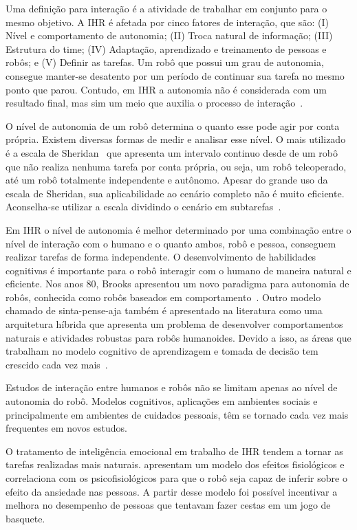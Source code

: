 Uma definição para interação é a atividade de trabalhar em conjunto para o mesmo objetivo. A IHR é afetada por cinco fatores de interação, que são: (I) Nível e comportamento de autonomia; (II) Troca natural de informação; (III) Estrutura do time; (IV) Adaptação, aprendizado e treinamento de pessoas e robôs; e (V) Definir as tarefas. Um robô que possui um grau de autonomia, consegue manter-se desatento por um período de continuar sua tarefa no mesmo ponto que parou. Contudo, em IHR a autonomia não é considerada com um resultado final, mas sim um meio que auxilia o processo de interação~\cite{goodrich:2007, weiss:2010}.

O nível de autonomia de um robô determina o quanto esse pode agir por conta própria. Existem diversas formas de medir e analisar esse nível. O mais utilizado é a escala de Sheridan~\cite{sheridan:1978} que apresenta um intervalo continuo desde de um robô que não realiza nenhuma tarefa por conta própria, ou seja, um robô teleoperado, até um robô totalmente independente e autônomo. Apesar do grande uso da escala de Sheridan, sua aplicabilidade ao cenário completo não é muito eficiente. Aconselha-se utilizar a escala dividindo o cenário em subtarefas~\cite{goodrich:2007, weiss:2010}.

Em IHR o nível de autonomia é melhor determinado por uma combinação entre o nível de interação com o humano e o quanto ambos, robô e pessoa, conseguem realizar tarefas de forma independente. O desenvolvimento de habilidades cognitivas é importante para o robô interagir com o humano de maneira natural e eficiente. Nos anos 80, Brooks apresentou um novo paradigma para autonomia de robôs, conhecida como robôs baseados em comportamento~\cite{brooks:1986, brooks:1991}. Outro modelo chamado de sinta-pense-aja também é apresentado na literatura como uma arquitetura híbrida que apresenta um problema de desenvolver comportamentos naturais e atividades robustas para robôs humanoides. Devido a isso, as áreas que trabalham no modelo cognitivo de aprendizagem e tomada de decisão tem crescido cada vez mais~\cite{goodrich:2007}.

Estudos de interação entre humanos e robôs não se limitam apenas ao nível de autonomia do robô. Modelos cognitivos, aplicações em ambientes sociais e principalmente em ambientes de cuidados pessoais, têm se tornado cada vez mais frequentes em novos estudos.

O tratamento de inteligência emocional em trabalho de IHR tendem a tornar as tarefas realizadas mais naturais.  apresentam um modelo dos efeitos fisiológicos e correlaciona com os psicofisiológicos para que o robô seja capaz de inferir sobre o efeito da ansiedade nas pessoas. A partir desse modelo foi possível incentivar a melhora no desempenho de pessoas que tentavam fazer cestas em um jogo de basquete.

